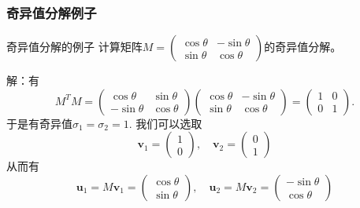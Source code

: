 \begin{frame}
\frametitle{奇异值分解例子}

\begin{block}{奇异值分解的例子}
计算矩阵$M = \begin{pmatrix} \cos\theta & -\sin\theta \\ \sin\theta & \cos\theta \end{pmatrix}$的奇异值分解。

\vspace{1em}
\pause

解：有
\[M^TM = \begin{pmatrix} \cos\theta & \sin\theta \\ -\sin\theta & \cos\theta \end{pmatrix} \begin{pmatrix} \cos\theta & -\sin\theta \\ \sin\theta & \cos\theta \end{pmatrix} = \begin{pmatrix} 1 & 0 \\ 0 & 1 \end{pmatrix}.\]
于是有奇异值$\sigma_1 = \sigma_2 = 1$. 我们可以选取
\[\mathbf{v}_1 = \begin{pmatrix} 1 \\ 0 \end{pmatrix}, \quad \mathbf{v}_2 = \begin{pmatrix} 0 \\ 1 \end{pmatrix}\]
从而有
\[\mathbf{u}_1 = M\mathbf{v}_1 = \begin{pmatrix} \cos\theta \\ \sin\theta \end{pmatrix}, \quad \mathbf{u}_2 = M\mathbf{v}_2 = \begin{pmatrix} -\sin\theta \\ \cos\theta \end{pmatrix}\]
\end{block}

\end{frame}


